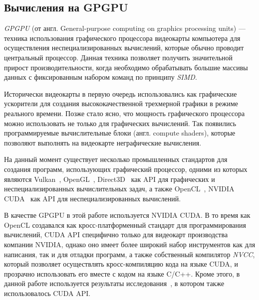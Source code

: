 
\subsection{Вычисления на GPGPU}

\textit{GPGPU} (от англ. General-purpose computing on graphics processing units) --- техника использования графического процессора видеокарты компьютера для осуществления неспециализированных вычислений, которые обычно проводит центральный процессор. Данная техника позволяет получить значительной прирост производительности, когда необходимо обрабатывать большие массивы данных с фиксированным набором команд по принципу \textit{SIMD}. 

Исторически видеокарты в первую очередь использовались как графические ускорители для создания высококачественной трехмерной графики в режиме реального времени. Позже стало ясно, что мощность графического процессора можно использовать не только для графических вычислений. Так появились программируемые вычислительные блоки (англ. compute shaders), которые позволяют выполнять на видеокарте неграфические вычисления.

На данный момент существует несколько промышленных стандартов для создания программ, использующих графический процессор, одними из которых являются Vulkan~\cite{net:spec_vulkan}, OpenGL~\cite{net:spec_opengl}, Direct3D~\cite{net:spec_direct3d} как API для графических и неспециализированных вычислительных задач, а также OpenCL~\cite{net:spec_opencl}, NVIDIA CUDA~\cite{net:cuda_toolkit_docs} как API для неспециализированных вычислений. 

В качестве GPGPU в этой работе используется NVIDIA CUDA. В то время как OpenCL создавался как кросс-платформенный стандарт для программирования вычислений, CUDA API специфично только для видеокарт производства компании NVIDIA, однако оно имеет более широкий набор инструментов как для написания, так и для отладки программ, а также собственный компилятор \textit{NVCC}, который позволяет осуществлять кросс-компиляцию кода на языке CUDA, и прозрачно использовать его вместе с кодом на языке C/C++. Кроме этого, в данной работе используется результаты исследования~\cite{inproceedings:cfqp_matrix_with_single_source}, в котором также использовалось CUDA API.

